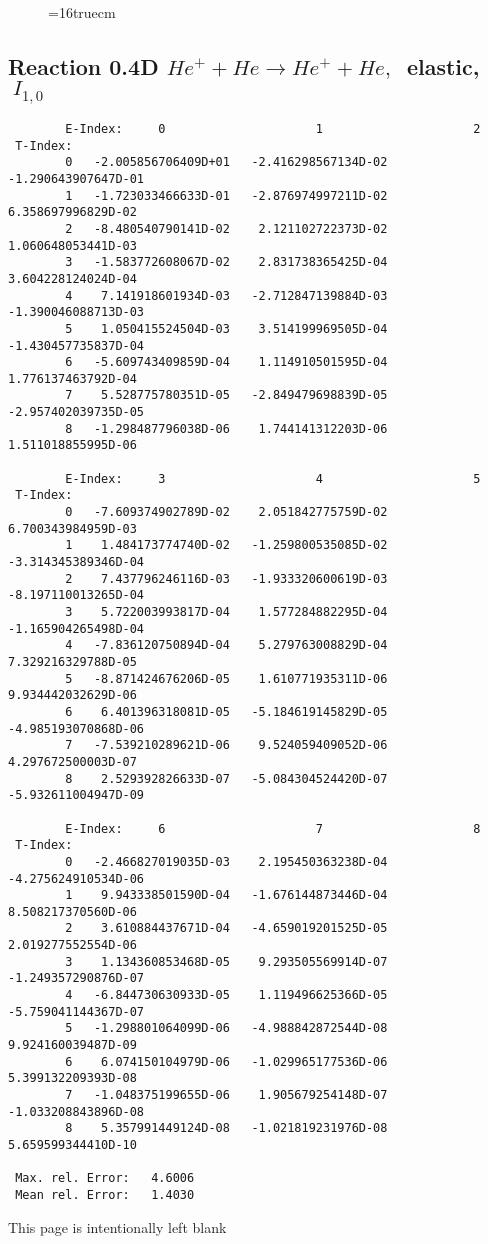 \documentclass[12pt]{article}
\begin{document}
\begin{figure} \label{0.4T}
\epsfxsize=16truecm
\end{figure}
\newpage

\subsection{
Reaction 0.4D  $He^+ + He \rightarrow He^+ + He ,\ $
 elastic, $\  I_{1,0}$
}

\begin{small}\begin{verbatim}
        E-Index:     0                     1                     2
 T-Index:
        0   -2.005856706409D+01   -2.416298567134D-02   -1.290643907647D-01
        1   -1.723033466633D-01   -2.876974997211D-02    6.358697996829D-02
        2   -8.480540790141D-02    2.121102722373D-02    1.060648053441D-03
        3   -1.583772608067D-02    2.831738365425D-04    3.604228124024D-04
        4    7.141918601934D-03   -2.712847139884D-03   -1.390046088713D-03
        5    1.050415524504D-03    3.514199969505D-04   -1.430457735837D-04
        6   -5.609743409859D-04    1.114910501595D-04    1.776137463792D-04
        7    5.528775780351D-05   -2.849479698839D-05   -2.957402039735D-05
        8   -1.298487796038D-06    1.744141312203D-06    1.511018855995D-06

        E-Index:     3                     4                     5
 T-Index:
        0   -7.609374902789D-02    2.051842775759D-02    6.700343984959D-03
        1    1.484173774740D-02   -1.259800535085D-02   -3.314345389346D-04
        2    7.437796246116D-03   -1.933320600619D-03   -8.197110013265D-04
        3    5.722003993817D-04    1.577284882295D-04   -1.165904265498D-04
        4   -7.836120750894D-04    5.279763008829D-04    7.329216329788D-05
        5   -8.871424676206D-05    1.610771935311D-06    9.934442032629D-06
        6    6.401396318081D-05   -5.184619145829D-05   -4.985193070868D-06
        7   -7.539210289621D-06    9.524059409052D-06    4.297672500003D-07
        8    2.529392826633D-07   -5.084304524420D-07   -5.932611004947D-09

        E-Index:     6                     7                     8
 T-Index:
        0   -2.466827019035D-03    2.195450363238D-04   -4.275624910534D-06
        1    9.943338501590D-04   -1.676144873446D-04    8.508217370560D-06
        2    3.610884437671D-04   -4.659019201525D-05    2.019277552554D-06
        3    1.134360853468D-05    9.293505569914D-07   -1.249357290876D-07
        4   -6.844730630933D-05    1.119496625366D-05   -5.759041144367D-07
        5   -1.298801064099D-06   -4.988842872544D-08    9.924160039487D-09
        6    6.074150104979D-06   -1.029965177536D-06    5.399132209393D-08
        7   -1.048375199655D-06    1.905679254148D-07   -1.033208843896D-08
        8    5.357991449124D-08   -1.021819231976D-08    5.659599344410D-10

 Max. rel. Error:   4.6006
 Mean rel. Error:   1.4030

\end{verbatim}\end{small}
\newpage
This page is intentionally left blank
\newpage
\end{document}
